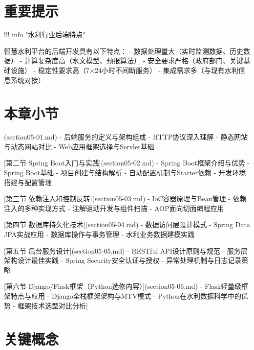 \section{重要提示}

\begin{tcolorbox}[colback=orange!5!white,colframe=orange!75!black,title=Warning 技术选型说明
    
    本章采用多技术栈并重的教学方式，理由如下：
    - **Java Spring Boot**：企业级应用开发的主流选择，适合大型系统
    - **Python框架**：在水利数据分析和科学计算方面具有天然优势
    - **技术选型原则**：根据项目规模、团队技能、业务需求综合考虑
    - **实际应用**：水利行业中Java和Python都有广泛应用场景]
!!! info "水利行业后端特点"
    
    智慧水利平台的后端开发具有以下特点：
    - 数据处理量大（实时监测数据、历史数据）
    - 计算复杂度高（水文模型、预报算法）
    - 安全要求严格（政府部门、关键基础设施）
    - 稳定性要求高（7×24小时不间断服务）
    - 集成需求多（与现有水利信息系统对接）
\end{tcolorbox}

\section{本章小节}

\begin{tcolorbox}[colback=cyan!5!white,colframe=cyan!75!black,title=Info 章节结构
    
     [第一节 后端服务概述](section05-01.md)
    - 后端服务的定义与架构组成
    - HTTP协议深入理解
    - 静态网站与动态网站对比
    - Web应用框架选择与Servlet基础
    
     [第二节 Spring Boot入门与实践](section05-02.md)
    - Spring Boot框架介绍与优势
    - Spring Boot基础
    - 项目创建与结构解析
    - 自动配置机制与Starter依赖
    - 开发环境搭建与配置管理
    
     [第三节 依赖注入和控制反转](section05-03.md)
    - IoC容器原理与Bean管理
    - 依赖注入的多种实现方式
    - 注解驱动开发与组件扫描
    - AOP面向切面编程应用
    
     [第四节 数据库持久化技术](section05-04.md)
    - 数据访问层设计模式
    - Spring Data JPA实战应用
    - 数据库操作与事务管理
    - 水利业务数据建模实践
    
     [第五节 后台服务设计](section05-05.md)
    - RESTful API设计原则与规范
    - 服务层架构设计最佳实践
    - Spring Security安全认证与授权
    - 异常处理机制与日志记录策略
    
     [第六节 Django/Flask框架（Python选修内容）](section05-06.md)
    - Flask轻量级框架特点与应用
    - Django全栈框架架构与MTV模式
    - Python在水利数据科学中的优势
    - 框架技术选型对比分析]
\section{关键概念}

\end{tcolorbox}

